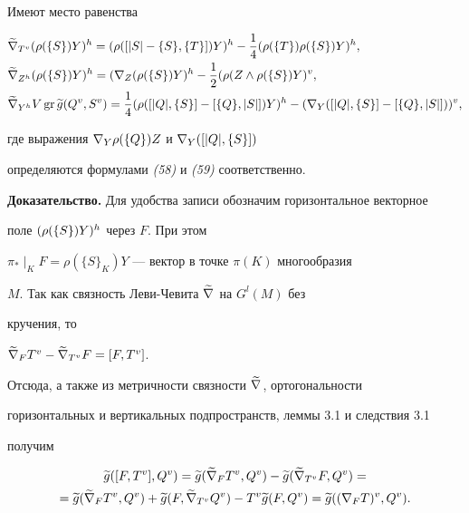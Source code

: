 \begin{lems} Имеют место равенства


\begin{align}




&\grn{\gv{T}}{\gh{(\rho(\{S\})Y)}}=\gh{(\rho([|S|-\{S\},\{ T\}])Y)}


-\4\gh{(\rho(\{T\})\rho(\{S\} )Y)},\\


%


&\grn{\gh{Z}}{\gh{(\rho(\{S\})Y)}}=\gh{(\n{Z}{(\rho(\{S\})Y)}}-


\1\gv{(\rho(Z\land\rho(\{S\})Y)},\\


%


&\grn{\gh{Y}}{V\gr \g{g}(\gv{Q},\gv{S})}=\4\gh{(\rho([|Q|,\{S\}]-


[\{Q\},|S|])Y)}-\gv{(\n{Y}{([|Q|,\{S\}]-[\{Q\},|S|])})},


\end{align}


где выражения $\nabla_{Y}{\rho(\{Q\})Z}$ и $\nabla_{Y}{([|Q|,\{S\}])}$


определяются формулами {\em (58)} и {\em (59)} соответственно.


\end{lems}





{\bf Доказательство.} Для удобства записи обозначим горизонтальное векторное


поле ${(\rho(\{S\})Y)}{}^h$ через $F$. При этом


$\pi_*\mid_KF=\rho(\{S\}_K)Y$ --- вектор в точке $\pi (K)$ многообразия


$M$. Так как связность Леви-Чевита $\widetilde {\nabla_{}{}}$ на $G^l(M)$ без


кручения, то


$\widetilde\nabla_{F}{{T}{}^v}-\widetilde\nabla_{{T}{}^v}{F}=[F,{T}{}^v]$.


Отсюда, а также из метричности связности $\widetilde {\nabla_{}{}}$, ортогональности


горизонтальных и вертикальных подпространств, леммы 3.1 и следствия 3.1


получим


\begin{multline*}


\g{g}([F,\gv{T}],\gv{Q})=\g{g}(\grn{F}{\gv{T}},\gv{Q})-


\g{g}(\grn{\gv{T}}{F},\gv{Q})=\\


=\g{g}(\grn{F}{\gv{T}},\gv{Q})+


\g{g}(F,\grn{\gv{T}}{\gv{Q}})-\gv{T}\g{g}(F,\gv{Q})=


\g{g}(\gv{(\n{F}{T})},\gv{Q}).


\end{multline*}


